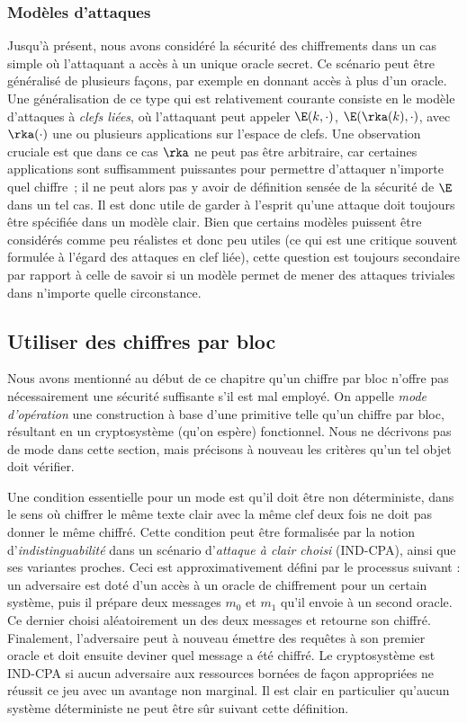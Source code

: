 \subsubsection{Modèles d'attaques}

Jusqu'à présent, nous avons considéré la sécurité des chiffrements dans un cas simple où l'attaquant a accès à un unique oracle secret.
Ce scénario peut être généralisé de plusieurs façons, par exemple en donnant accès à plus d'un oracle. Une généralisation de ce type qui est
relativement courante consiste en le modèle d'attaques à \emph{clefs liées}, où l'attaquant peut appeler
$\E(k,\cdot)$, $\E(\rka(k),\cdot)$, avec $\rka(\cdot)$ une ou plusieurs applications sur l'espace de clefs.
Une observation cruciale est que dans ce cas $\rka$ ne peut pas être arbitraire, car certaines applications sont suffisamment puissantes
pour permettre d'attaquer n'importe quel chiffre~; il ne peut alors pas y avoir de définition sensée de la sécurité de $\E$ dans un tel cas.
Il est donc utile de garder à l'esprit qu'une attaque doit toujours être spécifiée dans un modèle clair. Bien que certains modèles puissent
être considérés comme peu réalistes et donc peu utiles (ce qui est une critique souvent formulée à l'égard des attaques en clef liée), cette
question est toujours secondaire par rapport à celle de savoir si un modèle permet de mener des attaques triviales dans n'importe quelle circonstance. 

\subsection{Utiliser des chiffres par bloc}
\label{sec:cf_modes}

Nous avons mentionné au début de ce chapitre qu'un chiffre par bloc n'offre pas nécessairement une sécurité suffisante s'il est mal employé.
On appelle \emph{mode d'opération} une construction à base d'une primitive telle qu'un chiffre par bloc, résultant en un cryptosystème (qu'on espère) fonctionnel.
Nous ne décrivons pas de mode dans cette section, mais précisons à nouveau les critères qu'un tel objet doit vérifier.

Une condition essentielle pour un mode est qu'il doit être non déterministe, dans le sens où chiffrer le même texte clair avec la même clef deux fois ne
doit pas donner le même chiffré. Cette condition peut être formalisée par la notion d'\emph{indistinguabilité} dans un scénario d'\emph{attaque à clair choisi}
(\textsf{IND-CPA}), ainsi que ses variantes proches. Ceci est approximativement défini par le processus suivant : un adversaire est doté d'un accès
à un oracle de chiffrement pour un certain système, puis il prépare deux messages $m_0$ et $m_1$ qu'il envoie à un second oracle. Ce dernier
choisi aléatoirement un des deux messages et retourne son chiffré. Finalement, l'adversaire peut à nouveau émettre des requêtes à son premier oracle et doit ensuite
deviner quel message a été chiffré. Le cryptosystème est \textsf{IND-CPA} si aucun adversaire aux ressources bornées de façon appropriées ne réussit ce jeu
avec un avantage non marginal. Il est clair en particulier qu'aucun système déterministe ne peut être sûr suivant cette définition. 


